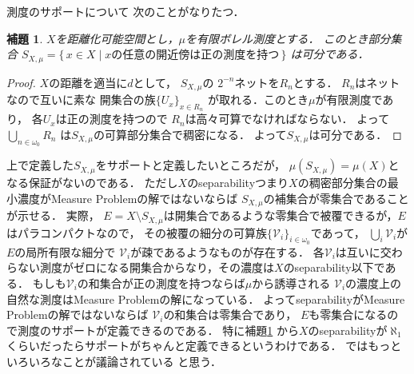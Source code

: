 \documentclass[leqno, 12pt]{jsarticle}
\newtheorem{lem}[thm]{補題}
\newcommand{\myomega}{\omega_{0}}
\begin{document}
測度のサポートについて
次のことがなりたつ．
\begin{lem}\label{lem:a1}
$X$を距離化可能空間とし，$\mu$を有限ボレル測度とする．
このとき部分集合
$S_{X, \mu}=\{\, x\in X\mid \text{$x$の任意の開近傍は正の測度を持つ}\, \}$
は可分である．
\end{lem}
\begin{proof}
$X$の距離を適当に$d$として，
$S_{X, \mu}$の
$2^{-n}$ネットを$R_{n}$とする．
$R_{n}$はネットなので互いに素な
開集合の族$\{U_{x}\}_{x\in R_{n}}$
が取れる．このとき$\mu$が有限測度であり，
各$U_{x}$は正の測度を持つので
$R_{n}$は高々可算でなければならない．
よって$\bigcup_{n\in \myomega}R_{n}$
は$S_{X, \mu}$の可算部分集合で稠密になる．
よって$S_{X, \mu}$は可分である．
\end{proof}
上で定義した$S_{X, \mu}$をサポートと定義したいところだが，
$\mu(S_{X, \mu})=\mu(X)$となる保証がないのである．
ただし$X$のseparabilityつまり$X$の稠密部分集合の最小濃度がMeasure Problemの解ではないならば
$S_{X, \mu}$の補集合が零集合であることが示せる．
実際，
$E=X\setminus S_{X, \mu}$は開集合であるような零集合で被覆できるが，$E$はパラコンパクトなので，
その被覆の細分の可算族$\{\mathcal{V}_{i}\}_{i\in \myomega}$であって，
$\bigcup_{i}\mathcal{V}_{i}$が$E$の局所有限な細分で
$\mathcal{V}_{i}$が疎であるようなものが存在する．
各$\mathcal{V}_{i}$は互いに交わらない測度がゼロになる開集合からなり，その濃度は$X$のseparability以下である．
もしも$\mathcal{V}_{i}$の和集合が正の測度を持つならば$\mu$から誘導される
$\mathcal{V}_{i}$の濃度上の自然な測度はMeasure Problemの解になっている．
よってseparabilityがMeasure Problemの解ではないならば
$\mathcal{V}_{i}$の和集合は零集合であり，
$E$も零集合になるので測度のサポートが定義できるのである．
特に補題\ref{lem:a1} から$X$のseparabilityが$\aleph_{1}$
くらいだったらサポートがちゃんと定義できるというわけである．
\cite{colloq}ではもっといろいろなことが議論されている
と思う．
\end{document}
